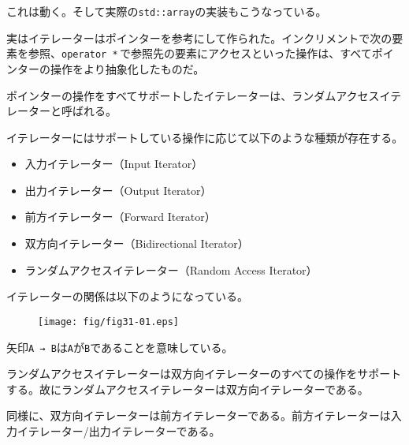 これは動く。そして実際の\texttt{std::array}の実装もこうなっている。

実はイテレーターはポインターを参考にして作られた。インクリメントで次の要素を参照、\texttt{operator *}\,で参照先の要素にアクセスといった操作は、すべてポインターの操作をより抽象化したものだ。

ポインターの操作をすべてサポートしたイテレーターは、ランダムアクセスイテレーターと呼ばれる。


イテレーターにはサポートしている操作に応じて以下のような種類が存在する。

\begin{itemize}
\item
  入力イテレーター（Input Iterator）
\item
  出力イテレーター（Output Iterator）
\item
  前方イテレーター（Forward Iterator）
\item
  双方向イテレーター（Bidirectional Iterator）
\item
  ランダムアクセスイテレーター（Random Access Iterator）
\end{itemize}

イテレーターの関係は以下のようになっている。

\begin{figure}[htbp]
  \centering
  \texttt{[image: fig/fig31-01.eps]}
  \label{fig:31-01}
\end{figure}

矢印\texttt{A → B}は\texttt{A}が\texttt{B}であることを意味している。

ランダムアクセスイテレーターは双方向イテレーターのすべての操作をサポートする。故にランダムアクセスイテレーターは双方向イテレーターである。

同様に、双方向イテレーターは前方イテレーターである。前方イテレーターは入力イテレーター/出力イテレーターである。

